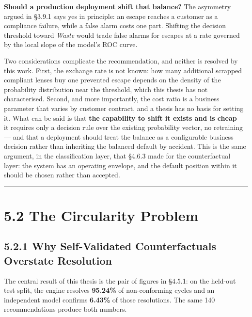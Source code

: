 \textbf{Should a production deployment shift that balance?} The asymmetry argued in §3.9.1 says yes in principle: an escape reaches a customer as a compliance failure, while a false alarm costs one part. Shifting the decision threshold toward \emph{Waste} would trade false alarms for escapes at a rate governed by the local slope of the model's ROC curve.

Two considerations complicate the recommendation, and neither is resolved by this work. First, the exchange rate is not known: how many additional scrapped compliant lenses buy one prevented escape depends on the density of the probability distribution near the threshold, which this thesis has not characterised. Second, and more importantly, the cost ratio is a business parameter that varies by customer contract, and a thesis has no basis for setting it. What can be said is that \textbf{the capability to shift it exists and is cheap} --- it requires only a decision rule over the existing probability vector, no retraining --- and that a deployment should treat the balance as a configurable business decision rather than inheriting the balanced default by accident. This is the same argument, in the classification layer, that §4.6.3 made for the counterfactual layer: the system has an operating envelope, and the default position within it should be chosen rather than accepted.

\begin{center}\rule{0.5\linewidth}{0.5pt}\end{center}

\hypertarget{the-circularity-problem}{%
\section{5.2 The Circularity Problem}\label{the-circularity-problem}}

\hypertarget{why-self-validated-counterfactuals-overstate-resolution}{%
\subsection{5.2.1 Why Self-Validated Counterfactuals Overstate Resolution}\label{why-self-validated-counterfactuals-overstate-resolution}}

The central result of this thesis is the pair of figures in §4.5.1: on the held-out test split, the engine resolves \textbf{95.24\%} of non-conforming cycles and an independent model confirms \textbf{6.43\%} of those resolutions. The same 140 recommendations produce both numbers.

